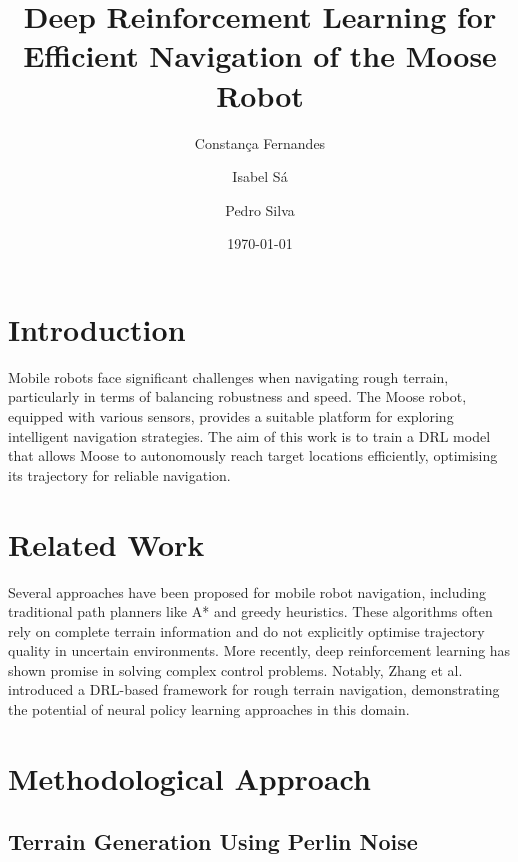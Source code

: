 \documentclass[11pt,twocolumn]{article}
\title{Deep Reinforcement Learning for Efficient Navigation of the Moose Robot}
\author{Constança Fernandes \and Isabel Sá \and Pedro Silva}
\date{\today}
\begin{document}

\section{Introduction}
Mobile robots face significant challenges when navigating rough terrain, particularly in terms of balancing robustness and speed. The Moose robot, equipped with various sensors, provides a suitable platform for exploring intelligent navigation strategies. The aim of this work is to train a DRL model that allows Moose to autonomously reach target locations efficiently, optimising its trajectory for reliable navigation.

\section{Related Work}

Several approaches have been proposed for mobile robot navigation, including traditional path planners like A* and greedy heuristics. These algorithms often rely on complete terrain information and do not explicitly optimise trajectory quality in uncertain environments. More recently, deep reinforcement learning has shown promise in solving complex control problems. Notably, Zhang et al. \cite{Zhang2018DRL} introduced a DRL-based framework for rough terrain navigation, demonstrating the potential of neural policy learning approaches in this domain.
\section{Methodological Approach}

\subsection{Terrain Generation Using Perlin Noise}
\end{document}
